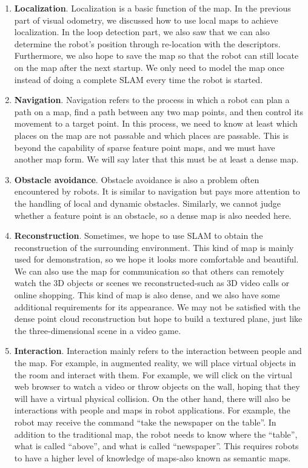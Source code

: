 \begin{enumerate}
	\item \textbf{Localization}. Localization is a basic function of the map. In the previous part of visual odometry, we discussed how to use local maps to achieve localization. In the loop detection part, we also saw that we can also determine the robot's position through re-location with the descriptors. Furthermore, we also hope to save the map so that the robot can still locate on the map after the next startup. We only need to model the map once instead of doing a complete SLAM every time the robot is started.
	\item \textbf{Navigation}. Navigation refers to the process in which a robot can plan a path on a map, find a path between any two map points, and then control its movement to a target point. In this process, we need to know at least which places on the map are not passable and which places are passable. This is beyond the capability of sparse feature point maps, and we must have another map form. We will say later that this must be at least a dense map.
	\item \textbf{Obstacle avoidance}. Obstacle avoidance is also a problem often encountered by robots. It is similar to navigation but pays more attention to the handling of local and dynamic obstacles. Similarly, we cannot judge whether a feature point is an obstacle, so a dense map is also needed here.
	\item \textbf{Reconstruction}. Sometimes, we hope to use SLAM to obtain the reconstruction of the surrounding environment. This kind of map is mainly used for demonstration, so we hope it looks more comfortable and beautiful. We can also use the map for communication so that others can remotely watch the 3D objects or scenes we reconstructed-such as 3D video calls or online shopping. This kind of map is also dense, and we also have some additional requirements for its appearance. We may not be satisfied with the dense point cloud reconstruction but hope to build a textured plane, just like the three-dimensional scene in a video game.
	\item \textbf{Interaction}. Interaction mainly refers to the interaction between people and the map. For example, in augmented reality, we will place virtual objects in the room and interact with them. For example, we will click on the virtual web browser to watch a video or throw objects on the wall, hoping that they will have a virtual physical collision. On the other hand, there will also be interactions with people and maps in robot applications. For example, the robot may receive the command ``take the newspaper on the table''. In addition to the traditional map, the robot needs to know where the ``table'', what is called ``above'', and what is called ``newspaper''. This requires robots to have a higher level of knowledge of maps-also known as semantic maps.
\end{enumerate}

